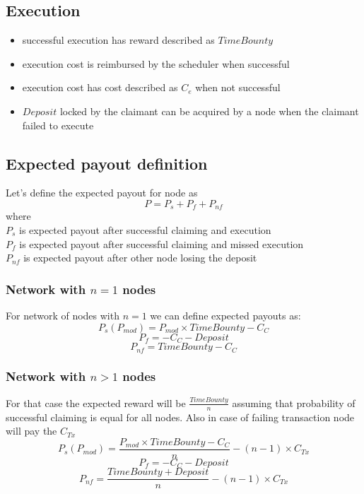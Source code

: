 \documentclass{report}
\begin{document}
\begin{appendices}
  \subsection{Execution}
  \begin{itemize}
  \item successful execution has reward described as $TimeBounty$
  \item execution cost is reimbursed by the scheduler when successful
  \item execution cost has cost described as $C_{e}$ when not successful
  \item $Deposit$ locked by the claimant can be acquired by a node when the claimant failed to execute
  \end{itemize}

  \subsection{Expected payout definition}
  Let's define the expected payout for node as
  \[
  P=P_{s}+P_{f}+P_{nf}
  \]
  where
  \\

  $P_{s}$ is expected payout after successful claiming and execution
  \\

  $P_{f}$ is expected payout after successful claiming and missed execution
  \\

  $P_{nf}$ is expected payout after other node losing the deposit
  \\

  \subsubsection{Network with $n=1$ nodes}
  For network of nodes with $n=1$ we can define expected payouts as:
  \[
  P_{s}(P_{mod})=P_{mod} \times TimeBounty-C_{C}
  \]
  \[
  P_{f}=-C_{C}-Deposit
  \]
  \[
  P_{nf}=TimeBounty-C_{C}
  \]
  \subsubsection{Network with $n>1$ nodes}
  For that case the expected reward will be $\frac{TimeBounty}{n}$ assuming that probability of successful claiming is equal for all nodes. Also in case of failing transaction node will pay the $C_{Tx}$
  \[
  P_{s}(P_{mod})=\frac{P_{mod} \times TimeBounty-C_{C}}{n} - (n-1) \times C_{Tx}
  \]
  \[
  P_{f}=-C_{C}-Deposit
  \]
  \[
  P_{nf}=\frac{TimeBounty+Deposit}{n} - (n-1) \times C_{Tx}
  \]


\end{appendices}
\end{document}
